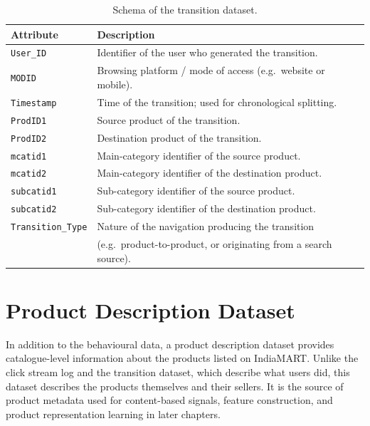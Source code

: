 \begin{table}[ht]
  \centering
  \caption{Schema of the transition dataset.}
  \label{tab:transition-schema}
  \begin{tabular}{ll}
    \toprule
    Attribute & Description \\
    \midrule
    \texttt{User\_ID}        & Identifier of the user who generated the transition. \\
    \texttt{MODID}           & Browsing platform / mode of access (e.g.\ website or mobile). \\
    \texttt{Timestamp}       & Time of the transition; used for chronological splitting. \\
    \texttt{ProdID1}         & Source product of the transition. \\
    \texttt{ProdID2}         & Destination product of the transition. \\
    \texttt{mcatid1}         & Main-category identifier of the source product. \\
    \texttt{mcatid2}         & Main-category identifier of the destination product. \\
    \texttt{subcatid1}       & Sub-category identifier of the source product. \\
    \texttt{subcatid2}       & Sub-category identifier of the destination product. \\
    \texttt{Transition\_Type}& Nature of the navigation producing the transition \\
                             & (e.g.\ product-to-product, or originating from a search source). \\
    \bottomrule
  \end{tabular}
\end{table}

\section{Product Description Dataset}
\label{sec:product-desc}

In addition to the behavioural data, a product description dataset provides
catalogue-level information about the products listed on IndiaMART. Unlike the
click stream log and the transition dataset, which describe what users did, this
dataset describes the products themselves and their sellers. It is the source of
product metadata used for content-based signals, feature construction, and
product representation learning in later chapters.

